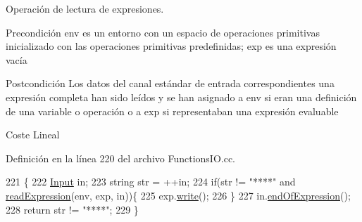 Operación de lectura de expresiones. 

\begin{DoxyPrecond}{Precondición}
\textquotesingle{}env\textquotesingle{} es un entorno con un espacio de operaciones primitivas inicializado con las operaciones primitivas predefinidas; \textquotesingle{}exp\textquotesingle{} es una expresión vacía 
\end{DoxyPrecond}
\begin{DoxyPostcond}{Postcondición}
Los datos del canal estándar de entrada correspondientes una expresión completa han sido leídos y se han asignado a \textquotesingle{}env\textquotesingle{} si eran una definición de una variable o operación o a \textquotesingle{}exp\textquotesingle{} si representaban una expresión evaluable 
\end{DoxyPostcond}
\begin{DoxyParagraph}{Coste}
Lineal 
\end{DoxyParagraph}


Definición en la línea 220 del archivo Functions\+I\+O.\+cc.


\begin{DoxyCode}
221 \{
222   \hyperlink{class_input}{Input} in;
223   \textcolor{keywordtype}{string} str = ++in;
224   \textcolor{keywordflow}{if}(str != \textcolor{stringliteral}{"****"} and \hyperlink{_functions_i_o_8cc_a0c2a0ba0f4fe2dfe26ec14053ce4d408}{readExpression}(env, exp, in))\{
225     exp.\hyperlink{class_expression_a6d5d0fa496e3713c332c9f1edc269de5}{write}();
226   \}
227   in.\hyperlink{class_input_a326f5a9c81353747b9f525bb32dbc8df}{endOfExpression}();
228   \textcolor{keywordflow}{return} str != \textcolor{stringliteral}{"****"};
229 \}
\end{DoxyCode}
